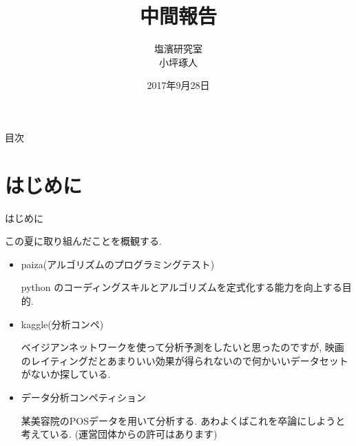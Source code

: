 \documentclass[dvipdfmx]{beamer}
\title[タイトル]{中間報告}
\author[発表者名]{塩濱研究室\\ 小坪琢人}
\institute[所属]{東京理科大学\ 工学部経営工学科4年\\学籍番号 4414036}
\date[日付]{2017年9月28日}
\begin{document}
\begin{frame}[plain]
\titlepage
\end{frame}
	
\begin{frame}{目次}
\tableofcontents
\end{frame}

\section{はじめに}
\begin{frame}{はじめに}

この夏に取り組んだことを概観する.

\begin{itemize}

\item paiza(アルゴリズムのプログラミングテスト)

python のコーディングスキルとアルゴリズムを定式化する能力を向上する目的.

\item kaggle(分析コンペ)

ベイジアンネットワークを使って分析予測をしたいと思ったのですが, 映画のレイティングだとあまりいい効果が得られないので何かいいデータセットがないか探している.

\item データ分析コンペティション

某美容院のPOSデータを用いて分析する. あわよくばこれを卒論にしようと考えている. (運営団体からの許可はあります)

\end{itemize}
\end{frame}
\end{document}
